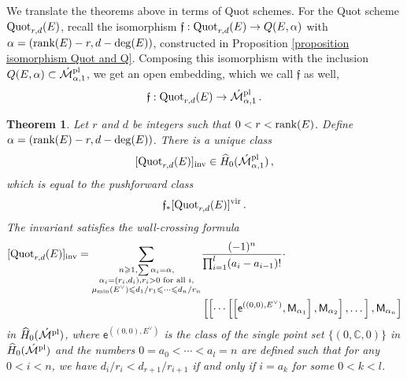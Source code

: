 \documentclass[11pt]{amsart}
\newtheorem{theorem}{Theorem}
\theoremstyle{remark}
\newcommand{\C}{\mathbb{C}}
\newcommand{\mf}[1]{\mathfrak{#1}}
\newcommand{\Mdash}{\acute{\mathcal{M}}}
\newcommand{\rk}{\textnormal{rank}}
\newcommand{\wh}[1]{\widehat{#1}}
\newcommand{\quot}[0]{\textnormal{Quot}}
\newcommand{\vir}[0]{\textnormal{vir}}
\newcommand{\inv}[0]{\textnormal{inv}}
\newcommand{\pl}[0]{\textnormal{pl}}
\newcommand{\sfM}{\mathsf M}
\numberwithin{theorem}{section}
\begin{document}
We translate the theorems above in terms of Quot schemes.
For the Quot scheme $\quot_{r,d}(E)$, recall the isomorphism
$\mf f : \quot_{r,d}(E) \to Q(E,\alpha)$
with $\alpha=(\rk(E)-r,d-\deg(E))$, constructed in Proposition \ref{proposition isomorphism Quot and Q}.
Composing this isomorphism with the inclusion $Q(E,\alpha) \subset \Mdash^\pl_{\alpha,1}$,
we get an open embedding, which we call $\mf f$ as well,
$$\mf f: \quot_{r,d}(E) \to \Mdash^\pl_{\alpha,1}\,.$$
\begin{theorem}\label{theorem wall crossing for quot scheme}
        Let $r$ and $d$ be integers such that $0<r<\rk(E)$.
        Define $\alpha=(\rk(E)-r,d-\deg(E))$.
        There is a unique class 
        $$[\quot_{r,d}(E)]_\inv \in \wh H_0(\Mdash^\pl_{\alpha,1})\,,$$
        which is equal to the pushforward class
        $$\mf f_*[\quot_{r,d}(E)]^\vir\,.$$
        The invariant satisfies the wall-crossing formula
        \begin{align}\label{equation wall crossing for quot to e^001}
        \nonumber
    [\quot_{r,d}(E)]_\inv
            =\sum_{\substack{n\geqslant 1, \sum \alpha_i = \alpha, \\ 
            \alpha_i=(r_i,d_i), r_i>0 \text{ for all }i,\\
            \mu_{\min}(E^\vee) \leqslant d_1/r_1\leqslant\cdots\leqslant d_n/r_n}} &
            \frac{(-1)^{n}}{\prod_{i=1}^l (a_i - a_{i-1})!} \cdot \\
            &  \left[\left[ \cdots
     \left[ \left[\mathsf e^{((0,0),E^\vee)},\sfM_{\alpha_1} \right], \sfM_{\alpha_2} \right],\dots \right], \sfM_{\alpha_n} \right]
    \end{align}
    in $\wh H_{0}(\Mdash^{\pl})$,
    where $\mathsf e^{((0,0),E^\vee)}$ is the class of the single point 
    set $\{(0,\C,0)\}$ in $\wh H_{0}(\Mdash^{\pl})$
    and the numbers $0=a_0<\cdots<a_l=n$ are defined such that for any $0<i<n$, 
    we have $d_i/r_i<d_{r+1}/r_{i+1}$ if and only if $i=a_k$ for some $0<k<l$.
    \end{theorem}
\end{document}
